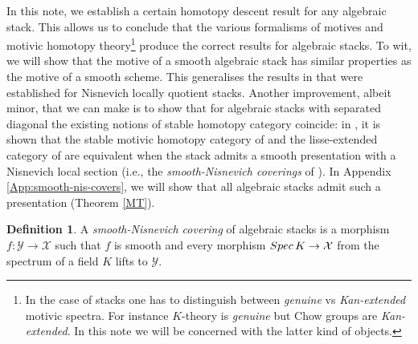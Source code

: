 \documentclass[10pt]{amsart}
\theoremstyle{plain}
\theoremstyle{definition}
\newtheorem{definition}[thm]{Definition}
\newcommand{\Spec}{{\rm Spec \,}}
\newcommand{\sX}{{\mathcal X}}
\newcommand{\sY}{{\mathcal Y}}
\begin{document}
In this note, we establish a certain homotopy descent result for any
algebraic stack.  This allows us to conclude that the various
formalisms of motives and motivic homotopy theory\footnote{In the case
  of stacks one has to distinguish between \textit{genuine} vs
  \textit{Kan-extended} motivic spectra. For instance $K$-theory is
  \textit{genuine} but Chow groups are \textit{Kan-extended}. In this
  note we will be concerned with the latter kind of objects.} produce
the correct results for algebraic stacks. To wit, we will show that
the motive of a smooth algebraic stack has similar properties as the
motive of a smooth scheme. This generalises the results in
\cite{cdh20} that were established for Nisnevich locally quotient
stacks. Another improvement, albeit minor, that we can make is to show
that for algebraic stacks with separated diagonal the existing notions
of stable homotopy category coincide: in \cite{chow21}, it is shown
that the stable motivic homotopy category of \cite{chow21} and the
lisse-extended category of \cite{khan2021generalized} are equivalent
when the stack admits a smooth presentation with a Nisnevich local
section (i.e., the \emph{smooth-Nisnevich coverings} of
\cite{pirisi2018}). In Appendix \ref{App:smooth-nis-covers}, we will
show that all algebraic stacks admit such a presentation (Theorem
\ref{MT}).




\begin{definition}
	A \emph{smooth-Nisnevich covering} of algebraic stacks is a morphism $f:\sY\rightarrow \sX$ such that $f$ is smooth and every morphism $\Spec K \rightarrow \sX$ from the spectrum of a field $K$ lifts to $\sY$. %
\end{definition}
\end{document}
